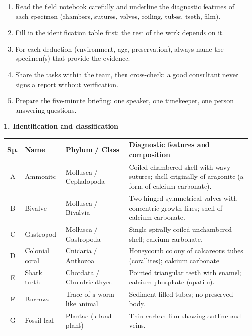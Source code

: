 \documentclass[11pt]{article}
\newcounter{popsec}
\newcounter{popsub}
\newcommand{\courssub}[1]{%
  \stepcounter{popsub}%
  \par\vspace{9pt}\noindent{\popxbold\fontsize{11.5}{13}\selectfont\color{popink}{\color{poporange}\thepopsec.\thepopsub}\hspace{6pt}#1}\par\nopagebreak\vspace{4pt}
}
\begin{document}
\begin{methode}
\begin{enumerate}
\item Read the field notebook carefully and underline the diagnostic features of each specimen (chambers, sutures, valves, coiling, tubes, teeth, film).
\item Fill in the identification table first; the rest of the work depends on it.
\item For each deduction (environment, age, preservation), always name the specimen(s) that provide the evidence.
\item Share the tasks within the team, then cross-check: a good consultant never signs a report without verification.
\item Prepare the five-minute briefing: one speaker, one timekeeper, one person answering questions.
\end{enumerate}
\end{methode}

\courssub{Model answer}

\textbf{1. Identification and classification}

\begin{center}
\begin{tabularx}{\linewidth}{|c|l|l|X|}
\hline
\rowcolor{popblueL} \textbf{Sp.} & \textbf{Name} & \textbf{Phylum / Class} & \textbf{Diagnostic features and composition} \\
\hline
A & Ammonite & Mollusca / Cephalopoda & Coiled chambered shell with wavy sutures; shell originally of aragonite (a form of calcium carbonate). \\
\hline
B & Bivalve & Mollusca / Bivalvia & Two hinged symmetrical valves with concentric growth lines; shell of calcium carbonate. \\
\hline
C & Gastropod & Mollusca / Gastropoda & Single spirally coiled unchambered shell; calcium carbonate. \\
\hline
D & Colonial coral & Cnidaria / Anthozoa & Honeycomb colony of calcareous tubes (corallites); calcium carbonate. \\
\hline
E & Shark teeth & Chordata / Chondrichthyes & Pointed triangular teeth with enamel; calcium phosphate (apatite). \\
\hline
F & Burrows & Trace of a worm-like animal & Sediment-filled tubes; no preserved body. \\
\hline
G & Fossil leaf & Plantae (a land plant) & Thin carbon film showing outline and veins. \\
\hline
\end{tabularx}
\end{center}
\end{document}
